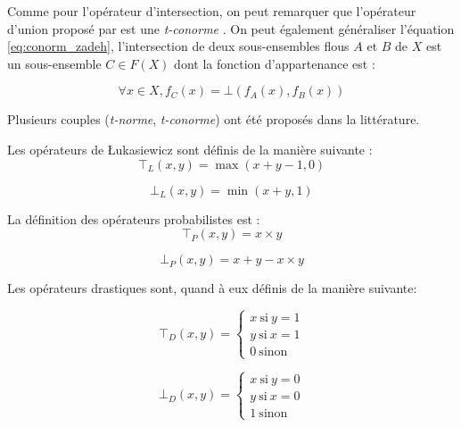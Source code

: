 Comme pour l'opérateur d'intersection, on peut remarquer que
l'opérateur d'union proposé par \textcite{Zadeh1965} est une
\emph{t-conorme} \autocite{Bouchon-Meunier2007}. On peut également
généraliser l'équation \ref{eq:conorm_zadeh}, l'intersection de deux
sous-ensembles flous \(A\) et \(B\) de \(X\) est un sous-ensemble
\(C ∈ F(X)\) dont la fonction d’appartenance est :

\begin{equation}
     ∀x ∈ X, f_C (x) = ⊥(f_A(x), f_B(x))  
\end{equation}

Plusieurs couples (\emph{t-norme}, \emph{t-conorme}) ont été proposés
dans la littérature.

Les opérateurs de Łukasiewicz sont définis de la manière suivante :
\begin{equation}
  ⊤_L(x,y) = \max(x + y - 1, 0) 
\end{equation}

\begin{equation}
  ⊥_L(x,y) = \min(x + y, 1)
\end{equation}

La définition des opérateurs probabilistes est :
\begin{equation}
  ⊤_P(x,y) = x×y
\end{equation}

\begin{equation}
  ⊥_P(x,y) = x+y - x×y
\end{equation}


Les opérateurs drastiques sont, quand à eux définis de la manière
suivante:

\begin{equation}
  ⊤_D(x,y)  = \left \{
    \begin{array}{ll}
      x\ \text{si}\ y=1\\
      y\ \text{si}\ x=1\\
      0\ \text{sinon}
    \end{array}
  \right.
\end{equation}


\begin{equation}
  ⊥_D(x,y)  = \left \{
    \begin{array}{ll}
      x\ \text{si}\ y=0\\
      y\ \text{si}\ x=0\\
      1\ \text{sinon}
    \end{array}
  \right.
\end{equation}



